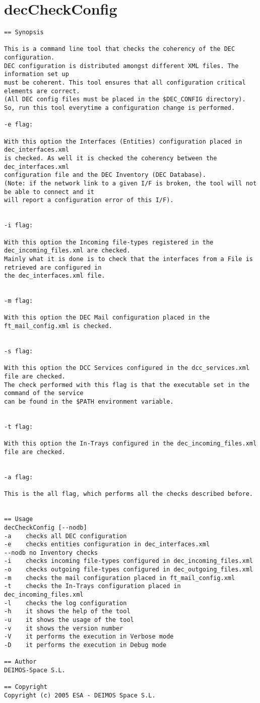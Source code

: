\documentclass[dec_sum_main.tex]{subfiles}
\begin{document}
\label{decCheckConfig}
\section{decCheckConfig}
 
\begin{verbatim}
== Synopsis

This is a command line tool that checks the coherency of the DEC configuration.
DEC configuration is distributed amongst different XML files. The information set up
must be coherent. This tool ensures that all configuration critical elements are correct.
(All DEC config files must be placed in the $DEC_CONFIG directory). 
So, run this tool everytime a configuration change is performed.

-e flag:

With this option the Interfaces (Entities) configuration placed in dec_interfaces.xml
is checked. As well it is checked the coherency between the dec_interfaces.xml
configuration file and the DEC Inventory (DEC Database).
(Note: if the network link to a given I/F is broken, the tool will not be able to connect and it
will report a configuration error of this I/F).


-i flag:

With this option the Incoming file-types registered in the dec_incoming_files.xml are checked.
Mainly what it is done is to check that the interfaces from a File is retrieved are configured in 
the dec_interfaces.xml file.


-m flag:

With this option the DEC Mail configuration placed in the ft_mail_config.xml is checked.


-s flag:

With this option the DCC Services configured in the dcc_services.xml file are checked.
The check performed with this flag is that the executable set in the command of the service
can be found in the $PATH environment variable.


-t flag:

With this option the In-Trays configured in the dec_incoming_files.xml file are checked.


-a flag:

This is the all flag, which performs all the checks described before.


== Usage
decCheckConfig [--nodb]
-a    checks all DEC configuration
-e    checks entities configuration in dec_interfaces.xml
--nodb no Inventory checks
-i    checks incoming file-types configured in dec_incoming_files.xml
-o    checks outgoing file-types configured in dec_outgoing_files.xml
-m    checks the mail configuration placed in ft_mail_config.xml
-t    checks the In-Trays configuration placed in dec_incoming_files.xml
-l    checks the log configuration
-h    it shows the help of the tool
-u    it shows the usage of the tool
-v    it shows the version number
-V    it performs the execution in Verbose mode
-D    it performs the execution in Debug mode     

== Author
DEIMOS-Space S.L.

== Copyright
Copyright (c) 2005 ESA - DEIMOS Space S.L.

\end{verbatim}
\end{document}
